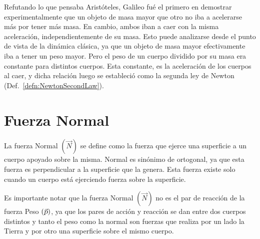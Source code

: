 \documentclass[a5paper,12pt,twoside]{book}
\begin{document}
Refutando lo que pensaba Aristóteles, Galileo fué el primero en demostrar experimentalmente que un objeto de masa mayor que otro no iba a acelerarse más por tener más masa. En cambio, ambos iban a caer con la misma aceleración, independientemente de su masa. Esto puede analizarse desde el punto de vista de la dinámica clásica, ya que un objeto de masa mayor efectivamente iba a tener un peso mayor. Pero el peso de un cuerpo dividido por su masa era constante para distintos cuerpos. Esta constante, es la aceleración de los cuerpos al caer, y dicha relación luego se estableció como la segunda ley de Newton (Def.\ \ref{defn:NewtonSecondLaw}).


\section{Fuerza Normal}

La fuerza Normal $(\Vec{N})$ se define como la fuerza que ejerce una superficie a un cuerpo apoyado sobre la misma. Normal es sinónimo de ortogonal, ya que esta fuerza es perpendicular a la superficie que la genera. Esta fuerza existe solo cuando un cuerpo está ejerciendo fuerza sobre la superficie.

Es importante notar que la fuerza Normal $(\Vec{N})$ no es el par de reacción de la fuerza Peso $(\Vec{\textsl{p}})$, ya que los pares de acción y reacción se dan entre dos cuerpos distintos y tanto el peso como la normal son fuerzas que realiza por un lado la Tierra y por otro una superficie sobre el mismo cuerpo.
\end{document}
